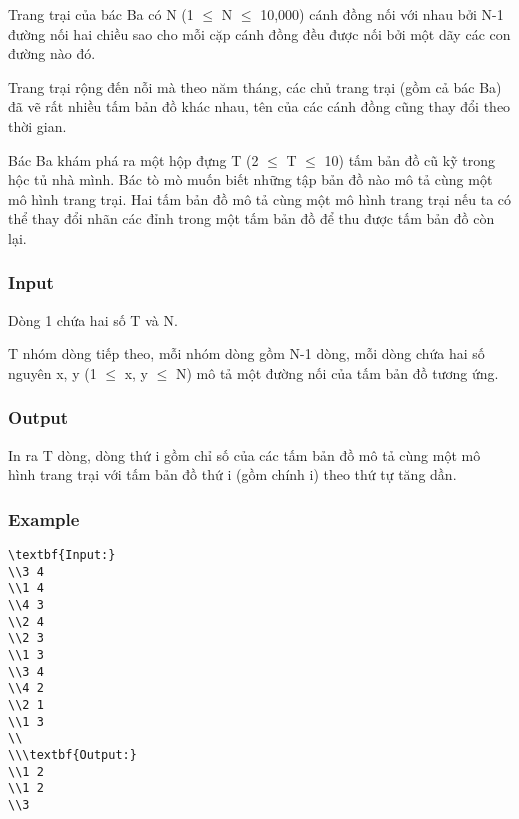 



   Trang trại của bác Ba có N (1  $\le$  N  $\le$  10,000) cánh đồng nối với nhau bởi N-1 đường nối hai chiều sao cho mỗi cặp cánh đồng đều được nối bởi một dãy các con đường nào đó.  

   Trang trại rộng đến nỗi mà theo năm tháng, các chủ trang trại (gồm cả bác Ba) đã vẽ rất nhiều tấm bản đồ khác nhau, tên của các cánh đồng cũng thay đổi theo thời gian.  

   Bác Ba khám phá ra một hộp đựng T (2  $\le$  T  $\le$  10) tấm bản đồ cũ kỹ trong hộc tủ nhà mình. Bác tò mò muốn biết những tập bản đồ nào mô tả cùng một mô hình trang trại. Hai tấm bản đồ mô tả cùng một mô hình trang trại nếu ta có thể thay đổi nhãn các đỉnh trong một tấm bản đồ để thu được tấm bản đồ còn lại.  

\subsubsection{   Input  }

   Dòng 1 chứa hai số T và N.  

   T nhóm dòng tiếp theo, mỗi nhóm dòng gồm N-1 dòng, mỗi dòng chứa hai số nguyên x, y (1  $\le$  x, y  $\le$  N) mô tả một đường nối của tấm bản đồ tương ứng.  

\subsubsection{   Output  }

   In ra T dòng, dòng thứ i gồm chỉ số của các tấm bản đồ mô tả cùng một mô hình trang trại với tấm bản đồ thứ i (gồm chính i) theo thứ tự tăng dần.  

\subsubsection{   Example  }
\begin{verbatim}
\textbf{Input:}
\\3 4
\\1 4
\\4 3
\\2 4
\\2 3
\\1 3
\\3 4
\\4 2
\\2 1
\\1 3
\\
\\\textbf{Output:}
\\1 2
\\1 2
\\3\end{verbatim}
